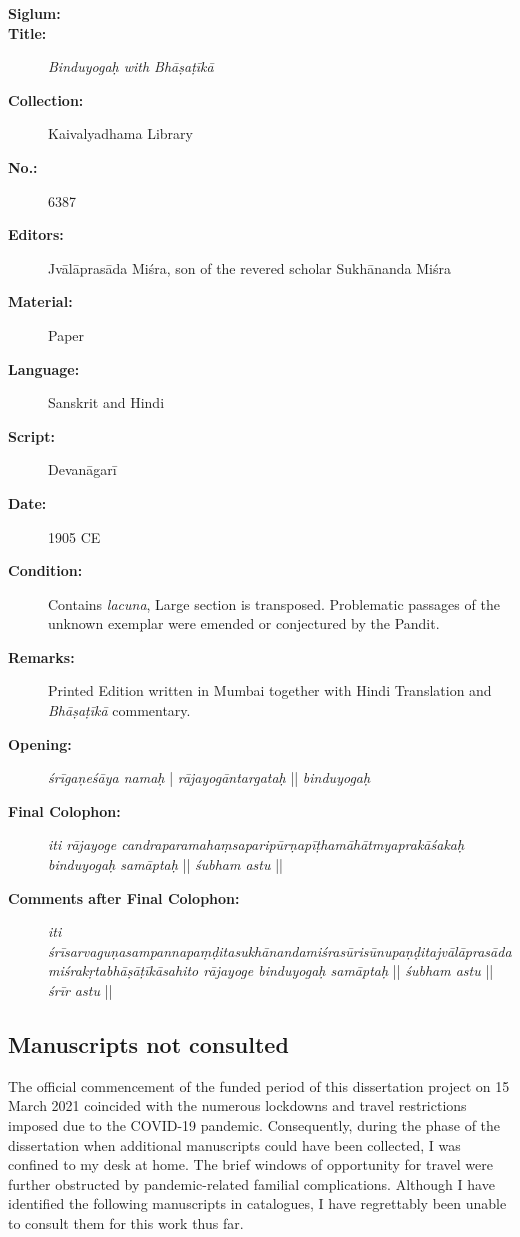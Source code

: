 \begin{description}
\item[\textbf{Siglum:}] \Huge{} \nocite{ytbe}
\item[\textbf{Title:}] \emph{Binduyogaḥ with Bhāṣaṭīkā}
\item[\textbf{Collection:}] Kaivalyadhama Library
\item[\textbf{No.:}] 6387
\item[\textbf{Editors:}] Jvālāprasāda Miśra, son of the revered scholar Sukhānanda Miśra
\item[\textbf{Material:}] Paper
\item[\textbf{Language:}] Sanskrit and Hindi
\item[\textbf{Script:}] Devanāgarī
\item[\textbf{Date:}] 1905 CE
\item[\textbf{Condition:}] Contains \textit{lacuna}, Large section is transposed. Problematic passages of the unknown exemplar were emended or conjectured by the Pandit.  
\item[\textbf{Remarks:}] Printed Edition written in Mumbai together with Hindi Translation and \emph{Bhāṣaṭīkā} commentary. 
\item[\textbf{Opening:}] \textit{śrīgaṇeśāya namaḥ} | \textit{rājayogāntargataḥ} || \textit{binduyogaḥ} 
\item[\textbf{Final Colophon:}] \textit{iti rājayoge candraparamahaṃsaparipūrṇapīṭhamāhātmyaprakāśakaḥ binduyogaḥ samāptaḥ} || \textit{śubham astu} ||  
\item[\textbf{Comments after Final Colophon:}] \textit{iti śrīsarvaguṇasampannapaṃḍitasukhānandamiśrasūrisūnupaṇḍitajvālāprasādamiśrakṛtabhāṣāṭīkāsahito rājayoge binduyogaḥ samāptaḥ} || \textit{śubham astu} || \textit{śrīr astu} ||
\end{description}
\newpage

\subsection{Manuscripts not consulted}

The official commencement of the funded period of this dissertation project on 15 March 2021 coincided with the numerous lockdowns and travel restrictions imposed due to the COVID-19 pandemic. Consequently, during the phase of the dissertation when additional manuscripts could have been collected, I was confined to my desk at home. The brief windows of opportunity for travel were further obstructed by pandemic-related familial complications. Although I have identified the following manuscripts in catalogues, I have regrettably been unable to consult them for this work thus far.

